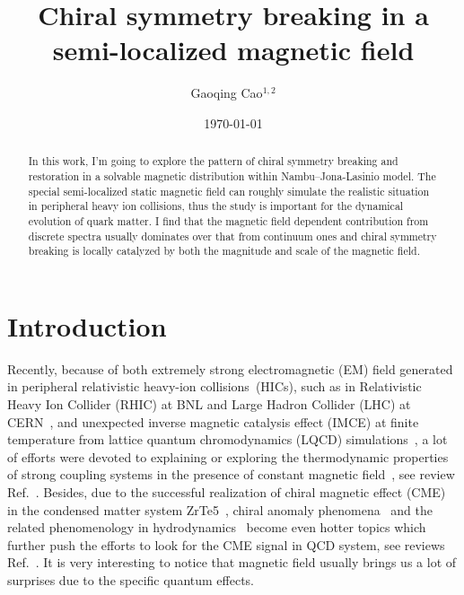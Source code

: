 \documentclass[aps,prd,amsmath,two column,amssymb,showpacs]{revtex4}
\begin{document}
\title{Chiral symmetry breaking in a semi-localized magnetic field}

\author{Gaoqing Cao$^{1,2}$}
\date{\today}
\begin{abstract}
	In this work, I'm going to explore the pattern of chiral symmetry breaking and restoration in a solvable magnetic distribution within Nambu--Jona-Lasinio model. The special semi-localized static magnetic field can roughly simulate the realistic situation in peripheral heavy ion collisions, thus the study is important for the dynamical evolution of quark matter. I find that the magnetic field dependent contribution from discrete spectra usually dominates over that from continuum ones and chiral symmetry breaking is locally catalyzed by both the magnitude and scale of the magnetic field.
\end{abstract}

\maketitle
\section{Introduction}
Recently, because of both extremely strong electromagnetic (EM) field generated in peripheral relativistic heavy-ion collisions~(HICs), such as in Relativistic Heavy Ion Collider (RHIC) at BNL and Large Hadron Collider (LHC) at CERN~\cite{Skokov:2009qp,Voronyuk:2011jd,Bzdak:2011yy,Deng:2012pc}, and unexpected inverse magnetic catalysis effect (IMCE) at finite temperature from lattice quantum chromodynamics (LQCD) simulations~\cite{Bali:2011qj,Bali:2012zg,Bruckmann:2013oba,Endrodi:2015oba}, a lot of efforts were devoted to explaining or exploring the thermodynamic properties of strong coupling systems in the presence of constant magnetic field~\cite{Fukushima:2012kc,Chao:2013qpa,Feng:2014bpa,Cao:2014uva,Mueller:2015fka,Guo:2015nsa,Cao:2015xja,Cao:2015cka,Bonati:2016kxj}, see review Ref.~\cite{Miransky:2015ava}. Besides, due to the successful realization of chiral magnetic effect (CME) in the condensed matter system ZrTe5~\cite{Li:2014bha}, chiral anomaly phenomena~\cite{Hattori:2016njk,Qiu:2016hzd} and the related phenomenology in hydrodynamics~\cite{Huang:2015fqj,Jiang:2015cva,Jiang:2016wve} become even hotter topics which further push the efforts to look for the CME signal in QCD system, see reviews Ref.~\cite{Liao:2014ava,Kharzeev:2015kna,Huang:2015oca,Kharzeev:2015znc}. It is very interesting to notice that magnetic field usually brings us a lot of surprises due to the specific quantum effects. 
\end{document}

